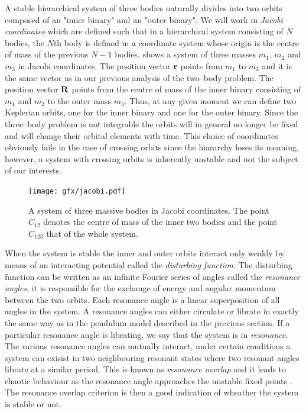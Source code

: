 A stable hierarchical system of three bodies naturally divides into
two orbits composed of an "inner binary" and an "outer binary". We will work
in \emph{Jacobi coordinates} which are defined such that in a hierarchical
system consisting of $N$ bodies, the $N$th body is defined in a coordinate 
system whose origin is the centre of mass of the previous $N-1$ bodies. 
 shows a system of three masses $m_1$, $m_2$ and $m_3$ in
Jacobi coordinates. The position vector $\boldsymbol{\mathbf{r}}$ points from $m_1$ to $m_2$ 
and it is the same vector as in our previous analysis of the two--body 
problem. The position vector $\boldsymbol{\mathbf{R}}$ points from the centre of mass
of the inner binary consisting of $m_1$ and $m_2$ to the outer mass $m_3$.
Thus, at any given moment we can define two Keplerian orbits, one for
the inner binary and one for the outer binary. Since the three--body
problem is not integrable the orbits will in general no longer be fixed
and will change their orbital elements with time. This choice of coordinates
obviously fails in the case of crossing orbits since the hiararchy loses
its meaning, however, a system with crossing orbits is inherently unstable
and not the subject of our interests.
\begin{figure}[htb]
\centering
\texttt{[image: gfx/jacobi.pdf]}
    \caption{A system of three massive bodies in Jacobi coordinates. 
    The point $C_{12}$ denotes the centre of mass of the inner two 
    bodies and the point $C_{123}$ that of the whole system.}
\label{fig:jacobi}
\end{figure}

When the system is stable the inner and outer orbits interact only 
weakly by means of an interacting potential called the 
\emph{disturbing function}. The disturbing function can be written
as an infinite Fourier series of angles called the \emph{resonance
angles}, it is responsible for the exchange of energy and angular 
momentum between the two orbits.  Each resonance angle is a linear
superposition of all angles in the system. A resonance angles can either 
circulate or librate in exactly the same way as in the pendulum model
described in the previous section.
If a particular resonance angle is librating, we say that the system
is in \emph{resonance}. The various resonance angles can mutually 
interact, under certain conditions a system can exisist in two 
neighbouring resonant states where two resonant angles librate 
at a similar period. This is known as \emph{resonance overlap} 
and it leads to chaotic behaviour as the resonance angle approaches
the unstable fixed points \citep{WalkerFord1969}. The resonance
overlap criterion is then a good indication of wheather the
system is stable or not.

